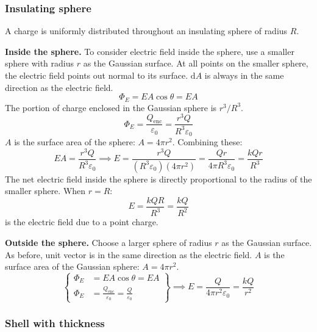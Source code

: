 \documentclass{article}
\begin{document}
\subsubsection{Insulating sphere}

A charge is uniformly distributed throughout an insulating sphere of radius $R$.

\textbf{Inside the sphere.} To consider electric field inside the sphere, use a smaller sphere with radius $r$ as the Gaussian surface. At all points on the smaller sphere, the electric field points out normal to its surface. $\mathrm{d}A$ is always in the same direction as the electric field.
\begin{equation*}
    \Phi_E=EA\cos\theta=EA
\end{equation*}
The portion of charge enclosed in the Gaussian sphere is $r^3/R^3$.
\begin{equation*}
	\Phi_E=\frac{Q_\text{enc}}{\varepsilon_0}=\frac{r^3Q}{R^3\varepsilon_0}
\end{equation*}
$A$ is the surface area of the sphere: $A=4\pi r^2$. Combining these:
\begin{equation*}
    EA=\frac{r^3Q}{R^3\varepsilon_0}
	\implies
	E=\frac{r^3Q}{(R^3\varepsilon_0)(4\pi r^2)}
	=\boxed{\frac{Qr}{4\pi R^3\varepsilon_0}
	=\frac{kQr}{R^3}}
\end{equation*}
The net electric field inside the sphere is directly proportional to the radius of the smaller sphere. When $r=R$:
\begin{equation*}
    E=\frac{kQR}{R^3}
	=\frac{kQ}{R^2}
\end{equation*}
is the electric field due to a point charge.

\textbf{Outside the sphere.} Choose a larger sphere of radius $r$ as the Gaussian surface. As before, unit vector is in the same direction as the electric field. $A$ is the surface area of the Gaussian sphere: $A=4\pi r^2$.
\begin{equation*}
	\left\{\begin{aligned}
		\Phi_E&=EA\cos\theta=EA \\
		\Phi_E&=\frac{Q_\text{enc}}{\varepsilon_0}=\frac{Q}{\varepsilon_0}
	\end{aligned}\right\}
	\implies E=\frac{Q}{4\pi r^2\varepsilon_0}=\boxed{\frac{kQ}{r^2}}
\end{equation*}

\subsubsection{Shell with thickness}
\end{document}
